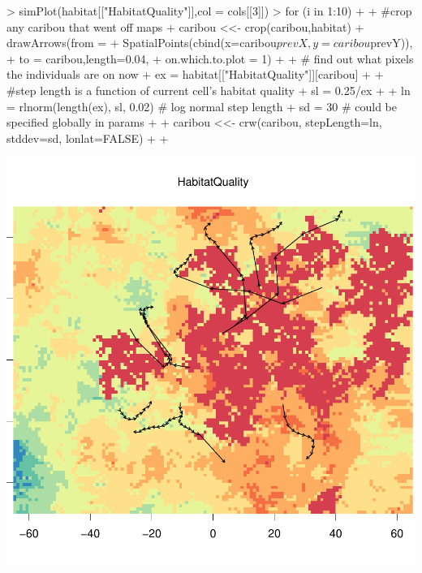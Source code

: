 \documentclass{article}
\begin{document}
\begin{Schunk}
\begin{Sinput}
> simPlot(habitat[["HabitatQuality"]],col = cols[[3]])
> for (i in 1:10) {
+ 
+   #crop any caribou that went off maps
+   caribou <<- crop(caribou,habitat)
+   drawArrows(from = 
+               SpatialPoints(cbind(x=caribou$prevX,y=caribou$prevY)),
+               to = caribou,length=0.04,
+               on.which.to.plot = 1)
+   
+   # find out what pixels the individuals are on now
+   ex =  habitat[["HabitatQuality"]][caribou] 
+   
+   #step length is a function of current cell's habitat quality
+   sl = 0.25/ex
+   
+   ln = rlnorm(length(ex), sl, 0.02) # log normal step length
+   sd = 30 # could be specified globally in params
+       
+   caribou <<- crw(caribou, stepLength=ln, stddev=sd, lonlat=FALSE)
+   
+ }
\end{Sinput}
\end{Schunk}
\includegraphics{introduction-Agent-crw-trajectory}
\end{document}
